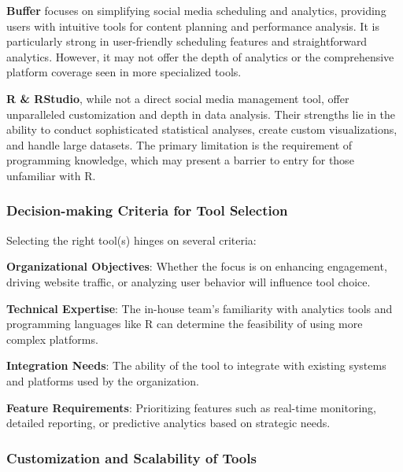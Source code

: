 \documentclass[
]{book}
\begin{document}
\textbf{Buffer} focuses on simplifying social media scheduling and analytics, providing users with intuitive tools for content planning and performance analysis. It is particularly strong in user-friendly scheduling features and straightforward analytics. However, it may not offer the depth of analytics or the comprehensive platform coverage seen in more specialized tools.

\textbf{R \& RStudio}, while not a direct social media management tool, offer unparalleled customization and depth in data analysis. Their strengths lie in the ability to conduct sophisticated statistical analyses, create custom visualizations, and handle large datasets. The primary limitation is the requirement of programming knowledge, which may present a barrier to entry for those unfamiliar with R.

\hypertarget{decision-making-criteria-for-tool-selection}{%
\subsubsection*{Decision-making Criteria for Tool Selection}\label{decision-making-criteria-for-tool-selection}}

Selecting the right tool(s) hinges on several criteria:

\textbf{Organizational Objectives}: Whether the focus is on enhancing engagement, driving website traffic, or analyzing user behavior will influence tool choice.

\textbf{Technical Expertise}: The in-house team's familiarity with analytics tools and programming languages like R can determine the feasibility of using more complex platforms.

\textbf{Integration Needs}: The ability of the tool to integrate with existing systems and platforms used by the organization.

\textbf{Feature Requirements}: Prioritizing features such as real-time monitoring, detailed reporting, or predictive analytics based on strategic needs.

\hypertarget{customization-and-scalability-of-tools}{%
\subsubsection*{Customization and Scalability of Tools}\label{customization-and-scalability-of-tools}}
\end{document}
